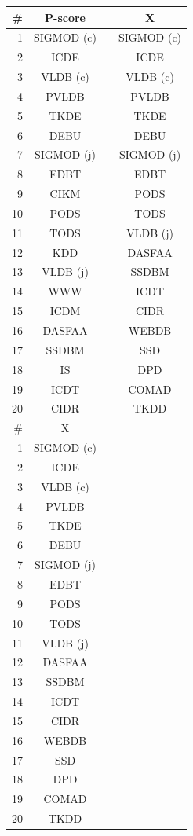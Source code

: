 \begin{table}[htbp]
\begin{tabular}{rccc}
\#		&		P-score		&	&		X			\\ \hline
1		&		SIGMOD (c)	&	&		SIGMOD (c)	\\
2		&		ICDE		&	&		ICDE		\\
3		&		VLDB (c)	&	&		VLDB (c)	\\
4		&		PVLDB		&	&		PVLDB		\\
5		&		TKDE		&	&		TKDE		\\
6		&		DEBU		&	&		DEBU		\\
7		&		SIGMOD (j)	&	&		SIGMOD (j)	\\
8		&		EDBT		&	&		EDBT		\\
9		&		CIKM		&	&		PODS		\\
10		&		PODS		&	&		TODS		\\
11		&		TODS		&	&		VLDB (j)	\\
12		&		KDD			&	&		DASFAA		\\
13		&		VLDB (j)	&	&		SSDBM		\\
14		&		WWW			&	&		ICDT		\\
15		&		ICDM		&	&		CIDR		\\
16		&		DASFAA		&	&		WEBDB		\\
17		&		SSDBM		&	&		SSD			\\
18		&		IS			&	&		DPD			\\
19		&		ICDT		&	&		COMAD		\\
20		&		CIDR		&	&		TKDD		\\

\#		&		X			\\ \hline
1		&		SIGMOD (c)	\\
2		&		ICDE		\\
3		&		VLDB (c)	\\
4		&		PVLDB		\\
5		&		TKDE		\\
6		&		DEBU		\\
7		&		SIGMOD (j)	\\
8		&		EDBT		\\
9		&		PODS		\\
10		&		TODS		\\
11		&		VLDB (j)	\\
12		&		DASFAA		\\
13		&		SSDBM		\\
14		&		ICDT		\\
15		&		CIDR		\\
16		&		WEBDB		\\
17		&		SSD			\\
18		&		DPD			\\
19		&		COMAD		\\
20		&		TKDD		\\
\end{tabular}
\end{table}

